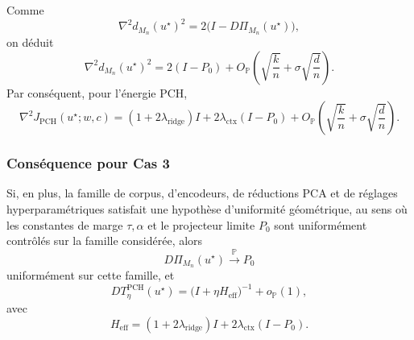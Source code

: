 \begin{corollary}
Comme
\[
\nabla^2 d_{M_n}(u^\star)^2
=
2\bigl(I-D\Pi_{M_n}(u^\star)\bigr),
\]
on déduit
\[
\nabla^2 d_{M_n}(u^\star)^2
=
2(I-P_0)+O_{\mathbb P}\!\left(
\sqrt{\frac{k}{n}}+\sigma\sqrt{\frac{d}{n}}
\right).
\]
Par conséquent, pour l'énergie PCH,
\[
\nabla^2 J_{\mathrm{PCH}}(u^\star;w,c)
=
(1+2\lambda_{\mathrm{ridge}})I
+
2\lambda_{\mathrm{ctx}}(I-P_0)
+
O_{\mathbb P}\!\left(
\sqrt{\frac{k}{n}}+\sigma\sqrt{\frac{d}{n}}
\right).
\]
\end{corollary}

\subsubsection{Conséquence pour Cas 3}

Si, en plus, la famille de corpus, d'encodeurs, de réductions PCA et de réglages hyperparamétriques satisfait une hypothèse d'uniformité géométrique, au sens où les constantes de marge \(\tau,\alpha\) et le projecteur limite \(P_0\) sont uniformément contrôlés sur la famille considérée, alors
\[
D\Pi_{M_n}(u^\star)\xrightarrow{\mathbb P}P_0
\]
uniformément sur cette famille, et
\[
DT_\eta^{\mathrm{PCH}}(u^\star)
=
\bigl(I+\eta H_{\mathrm{eff}}\bigr)^{-1}
+
o_{\mathbb P}(1),
\]
avec
\[
H_{\mathrm{eff}}
=
(1+2\lambda_{\mathrm{ridge}})I
+
2\lambda_{\mathrm{ctx}}(I-P_0).
\]

